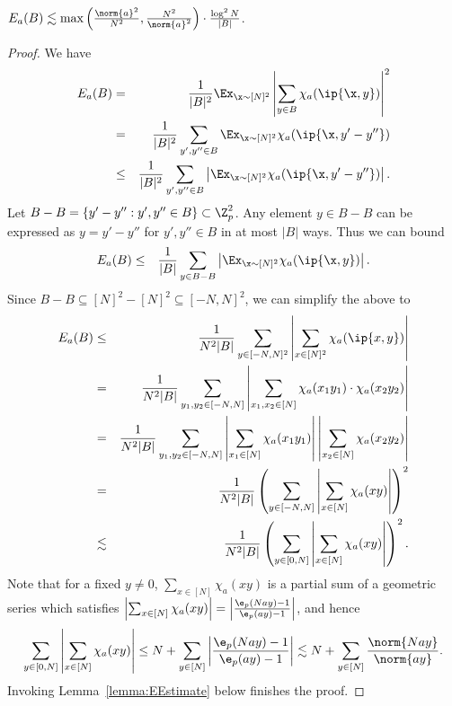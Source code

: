  \begin{lemma}
 \label{lemma:prodset}
	 $  E_a(B) \lesssim \max\left(\frac{\norm{a}^2}{N^2},\frac{N^2}{\norm{a}^2}\right) \cdot \frac{ \log^2 N}{|B|}$.
 \end{lemma}
 \begin{proof}
 We have
\begin{eqnarray*}
E_a(B)  &=&  \frac{1}{|B|^2} \Ex_{\x \sim [N]^2}  \left|\sum_{y \in B} \chi_a(\ip{\x,y })\right|^2 \\
&=&   \frac{1}{|B|^2} \sum_{y', y'' \in B}  \Ex_{\x \sim [N]^2} \chi_a(\ip{\x,y'-y'' })  \\
&\le&   \frac{1}{|B|^2}   \sum_{y', y'' \in B}\left| \Ex_{\x \sim [N]^2}  \chi_a(\ip{\x, y'-y''}) \right|. \\
\end{eqnarray*}
Let $B-B=\{y'-y'': y',y'' \in B\} \subset \Z_p^2$. Any element $y \in B-B$ can be expressed as $y=y'-y''$ for $y',y'' \in B$ in at most $|B|$ ways. Thus we can bound
\begin{eqnarray*}
E_a(B)
&\le &   \frac{1}{|B|}  \sum_{y \in B-B} \left| \Ex_{\x \sim [N]^2}  \chi_a(\ip{\x, y}) \right|.
\end{eqnarray*}
Since $B-B \subseteq [N]^2-[N]^2   \subseteq [-N,N]^2$, we can simplify the above  to
%
\begin{eqnarray*}
E_a(B)    &\le&   \frac{1}{N^2 |B|} \sum_{y \in [-N,N]^2}  \left| \sum_{x \in [N]^2}  \chi_a(\ip{x, y}) \right|\\
&=& \frac{1}{N^2|B|} \sum_{y_1,y_2 \in [-N,N]}  \left|\sum_{x_1,x_2 \in [N]}   \chi_a( x_1y_1 )\cdot \chi_a( x_2y_2 ) \right|  \\
	&=&   \frac{1}{N^2|B|} \sum_{y_1,y_2 \in [-N,N]}  \left|  \sum_{x_1 \in [N]}   \chi_a( x_1 y_1 ) \right|\left|  \sum_{x_2 \in [N]}   \chi_a( x_2 y_2 ) \right|    \\
	&=&  \frac{1}{N^2|B|} \left( \sum_{y \in [-N,N]}  \left|\sum_{x \in [N]}  \chi_a(xy) \right| \right)^2 \\
	& \lesssim &  \frac{1}{N^2|B|} \left(\sum_{y \in [0,N]}  \left|\sum_{x \in [N]}  \chi_a(xy) \right| \right)^2.
\end{eqnarray*}
	Note that for a fixed $y\neq 0$, $\sum_{x \in [N]}  \chi_a(xy)$ is a partial sum of a geometric series which satisfies $\left| \sum_{x \in [N]}  \chi_a(xy) \right|= \left| \frac{\e_p(N a y)-1}{\e_p(ay)-1} \right|$, and hence
	$$  \sum_{y \in [0,N]}  \left|\sum_{x \in [N]}  \chi_a(xy) \right| \le N +  \sum_{y \in [N]}  \left| \frac{\e_p(N ay)-1}{\e_p(ay)-1} \right|\lesssim  N+\sum_{y \in [N]} \frac{\norm{Nay}}{\norm{ay}}.  $$
Invoking Lemma~\ref{lemma:EEstimate} below  finishes the proof.
\end{proof}

